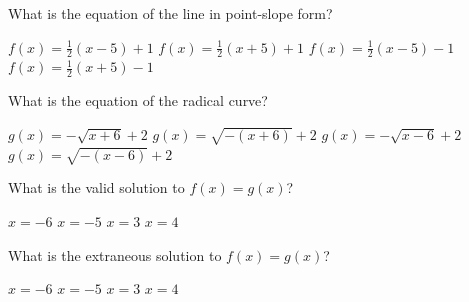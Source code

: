 \documentclass[12pt]{exam}
\begin{document}
\begin{questions}


\question What is the equation of the line in point-slope form?

\begin{choices} 
	\choice $f(x)=\frac{1}{2}(x-5)+1$
	\correctchoice $f(x)=\frac{1}{2}(x+5)+1$
	\choice $f(x)=\frac{1}{2}(x-5)-1$
	\choice $f(x)=\frac{1}{2}(x+5)-1$
\end{choices}


\question What is the equation of the radical curve?

\begin{choices} 
	\correctchoice $g(x)=-\sqrt{x+6}+2$
	\choice $g(x)=\sqrt{-(x+6)}+2$
	\choice $g(x)=-\sqrt{x-6}+2$
	\choice $g(x)=\sqrt{-(x-6)}+2$
\end{choices}


\question What is the valid solution to $f(x)=g(x)$?

\begin{choices} 
	\choice $x=-6$
	\correctchoice $x=-5$
	\choice $x=3$
	\choice $x=4$
\end{choices}

\question What is the extraneous solution to $f(x)=g(x)$?

\begin{choices} 
	\choice $x=-6$
	\choice $x=-5$
	\correctchoice $x=3$
	\choice $x=4$
\end{choices}


\end{questions}
\end{document}
